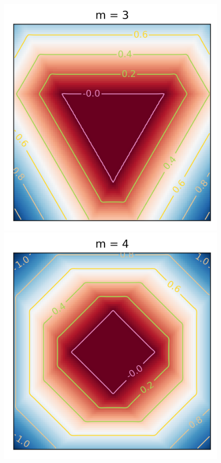 \documentclass{article} %
\begin{document}
\begin{figure}[h]
\begin{center}
\includegraphics[scale=0.35]{truedist3.png}
\includegraphics[scale=0.35]{truedist4.png}

\end{center}
\end{figure}
\end{document}
